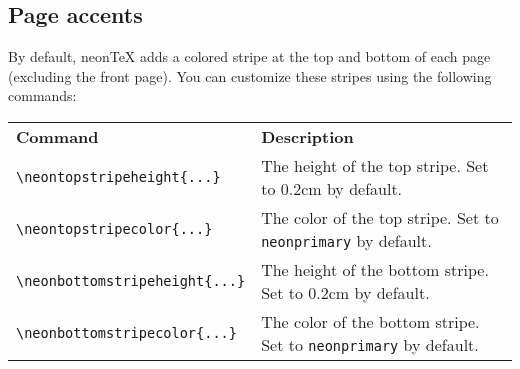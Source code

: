 \documentclass{neontex}
\begin{document}
	\subsection{Page accents}
	By default, neonTeX adds a colored stripe at the top and bottom of each page (excluding the front page). You can customize these stripes using the following commands:

	\begin{tabular}{ p{} p{} }
		\textbf{Command} & \textbf{Description} \\
		\texttt{\textbackslash neontopstripeheight\{...\}} & The height of the top stripe. Set to 0.2cm by default. \\
		\texttt{\textbackslash neontopstripecolor\{...\}} & The color of the top stripe. Set to \texttt{neonprimary} by default. \\
		\texttt{\textbackslash neonbottomstripeheight\{...\}} & The height of the bottom stripe. Set to 0.2cm by default. \\
		\texttt{\textbackslash neonbottomstripecolor\{...\}} & The color of the bottom stripe. Set to \texttt{neonprimary} by default. \\
	\end{tabular}
\end{document}
